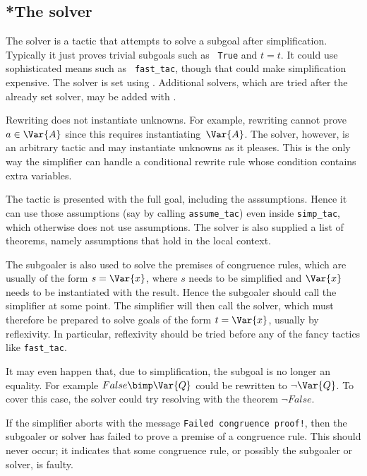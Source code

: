 \subsection{*The solver}\label{sec:simp-solver}
The solver is a tactic that attempts to solve a subgoal after
simplification.  Typically it just proves trivial subgoals such as {\tt
  True} and $t=t$.  It could use sophisticated means such as {\tt
  fast_tac}, though that could make simplification expensive.  The solver
is set using . Additional solvers, which are tried after
the already set solver, may be added with .

Rewriting does not instantiate unknowns.  For example, rewriting cannot
prove $a\in \Var{A}$ since this requires instantiating~$\Var{A}$.  The
solver, however, is an arbitrary tactic and may instantiate unknowns as it
pleases.  This is the only way the simplifier can handle a conditional
rewrite rule whose condition contains extra variables.

The tactic is presented with the full goal, including the asssumptions.
Hence it can use those assumptions (say by calling {\tt assume_tac}) even
inside {\tt simp_tac}, which otherwise does not use assumptions.  The
solver is also supplied a list of theorems, namely assumptions that hold in
the local context.

The subgoaler is also used to solve the premises of congruence rules, which
are usually of the form $s = \Var{x}$, where $s$ needs to be simplified and
$\Var{x}$ needs to be instantiated with the result.  Hence the subgoaler
should call the simplifier at some point.  The simplifier will then call the
solver, which must therefore be prepared to solve goals of the form $t =
\Var{x}$, usually by reflexivity.  In particular, reflexivity should be
tried before any of the fancy tactics like {\tt fast_tac}.  

It may even happen that, due to simplification, the subgoal is no longer an
equality.  For example $False \bimp \Var{Q}$ could be rewritten to
$\neg\Var{Q}$.  To cover this case, the solver could try resolving with the
theorem $\neg False$.

\begin{warn}
  If the simplifier aborts with the message {\tt Failed congruence proof!},
  then the subgoaler or solver has failed to prove a premise of a
  congruence rule.  This should never occur; it indicates that some
  congruence rule, or possibly the subgoaler or solver, is faulty.
\end{warn}


